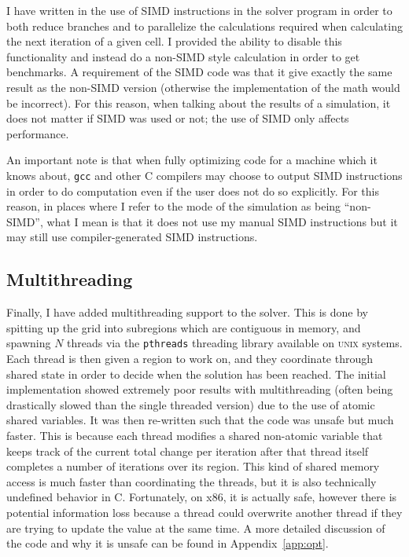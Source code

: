 I have written in the use of SIMD instructions in the solver program in order to both reduce branches and to parallelize
the calculations required when calculating the next iteration of a given cell. I provided the ability to disable this
functionality and instead do a non-SIMD style calculation in order to get benchmarks. A requirement of the SIMD code was
that it give exactly the same result as the non-SIMD version (otherwise the implementation of the math would be incorrect).
For this reason, when talking about the results of a simulation, it does not matter if SIMD was used or not; the use
of SIMD only affects performance.

An important note is that when fully optimizing code for a machine which it knows about, \texttt{gcc} and other C compilers may choose to output
SIMD instructions in order to do computation even if the user does not do so explicitly. For this reason, in places where
I refer to the mode of the simulation as being ``non-SIMD'', what I mean is that it does not use my manual SIMD instructions
but it may still use compiler-generated SIMD instructions.

















\subsection{Multithreading}
Finally, I have added multithreading support to the solver. This is done by spitting up the grid into subregions which
are contiguous in memory, and spawning $N$ threads via the \texttt{pthreads} threading library available on \textsc{unix} systems. Each thread is then given a region to work on,
and they coordinate through shared state in order to decide when the solution has been reached. The initial implementation
showed extremely poor results with multithreading (often being drastically slowed than the single threaded version)
due to the use of atomic shared variables. It was then re-written such that the code was unsafe but much faster. This
is because each thread modifies a shared non-atomic variable that keeps track of the current total change per iteration
after that thread itself completes a number of iterations over its region. This kind of shared memory access is much faster
than coordinating the threads, but it is also technically undefined behavior in C. Fortunately, on x86, it is actually
safe, however there is potential information loss because a thread could overwrite another thread if they are trying to
update the value at the same time. A more detailed discussion of the code and why it is unsafe can be found in Appendix~\ref{app:opt}.


















